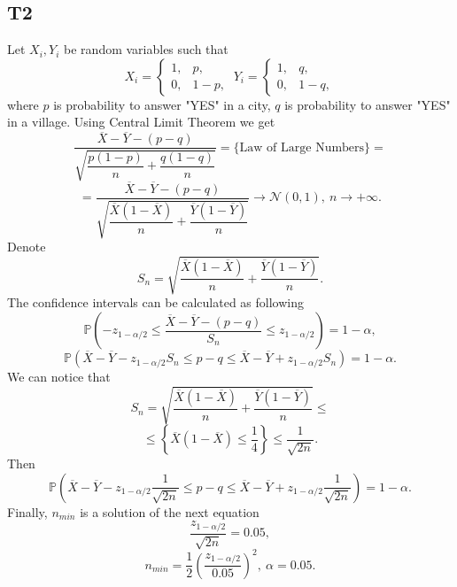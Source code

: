 \documentclass[a4paper, 12pt]{article}
\renewcommand*{\P}{\mathbb{P}}
\begin{document}
\subsection{T2}
Let $X_i, Y_i$ be random variables such that
$$
X_i = 
\begin{cases}
1, & p,\\
0, & 1- p,
\end{cases}
~
Y_i = 
\begin{cases}
1, & q,\\
0, & 1- q,
\end{cases}
$$
where $p$ is probability to answer "YES" in a city, $q$ is probability to answer "YES" in a village. 
Using Central Limit Theorem we get
$$
\dfrac{\overline{X} - \overline{Y} - (p - q)}{\sqrt{\dfrac{p(1-p)}{n} + \dfrac{q(1-q)}{n}}} = \{ \text{Law of Large Numbers} \} =
$$
$$ 
= \dfrac{\overline{X} - \overline{Y} - (p - q)}{\sqrt{\dfrac{\overline{X}(1-\overline{X})}{n} + \dfrac{\overline{Y}(1-\overline{Y})}{n}}}
\rightarrow \mathcal{N}(0, 1), ~ n \rightarrow + \infty.
$$
Denote 
$$
S_n = \sqrt{\dfrac{\overline{X}(1-\overline{X})}{n} + \dfrac{\overline{Y}(1-\overline{Y})}{n}}.
$$
The confidence intervals can be calculated as following 
$$
\P \left( -z_{1-\alpha /2} \leqslant \dfrac{\overline{X} - \overline{Y} - (p - q)}{S_n} \leqslant z_{1 - \alpha /2} \right) = 1 - \alpha,
$$
$$
\P \left(\overline{X} - \overline{Y} - z_{1 - \alpha/2} S_n \leqslant p - q \leqslant \overline{X} - \overline{Y} + z_{1 - \alpha/2} S_n \right) = 1 - \alpha.
$$
We can notice that 
$$
S_n = \sqrt{\dfrac{\overline{X}(1-\overline{X})}{n} + \dfrac{\overline{Y}(1-\overline{Y})}{n}} \leqslant $$
$$
\leqslant \left \{ \overline{X} (1 - \overline{X}) \leqslant \dfrac{1}{4} \right \} \leqslant \dfrac{1}{\sqrt{2n}}.
$$
Then
$$
\P \left(\overline{X} - \overline{Y} - z_{1 - \alpha/2} \dfrac{1}{\sqrt{2n}} \leqslant p - q \leqslant \overline{X} - \overline{Y} + z_{1 - \alpha/2} \dfrac{1}{\sqrt{2n}} \right) = 1 - \alpha.
$$
Finally, $n_{min}$ is a solution of the next equation
$$
\dfrac{z_{1 - \alpha/2}}{\sqrt{2n}} = 0.05,
$$
$$
n_{min} = \dfrac{1}{2} \left( \dfrac{z_{1 - \alpha/2}}{0.05} \right)^2, ~ \alpha = 0.05.
$$
\end{document}

